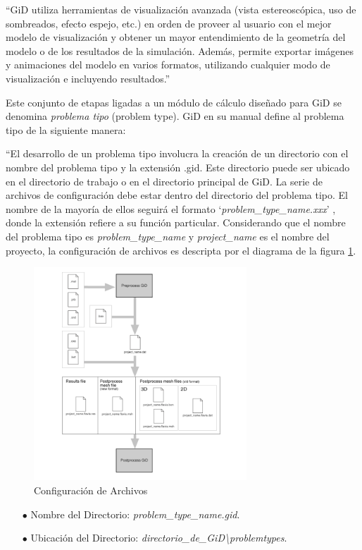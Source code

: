 \documentclass[a4paper,10pt, oneside]{book}
\begin{document}
“GiD utiliza herramientas de visualización avanzada (vista estereoscópica, uso de sombreados, efecto espejo, etc.) en orden de proveer al usuario con el mejor modelo de visualización y obtener un mayor entendimiento de la geometría del modelo o de los resultados de la simulación. Además, permite exportar imágenes y animaciones del modelo en varios formatos, utilizando cualquier modo de visualización e incluyendo resultados.” \cite{GiD}

Este conjunto de etapas ligadas a un módulo de cálculo diseñado para GiD se denomina \textit{problema tipo} (problem type). GiD en su manual define al problema tipo de la siguiente manera:

``El desarrollo de un problema tipo involucra la creación de un directorio con el nombre del problema tipo y la extensión .gid. Este directorio puede ser ubicado en el directorio de trabajo o en el directorio principal de GiD. La serie de archivos de configuración debe estar dentro del directorio del problema tipo. El nombre de la mayoría de ellos seguirá el formato `\textit{problem\_{type}\_{name.xxx}}' , donde la extensión refiere a su función particular. Considerando que el nombre del problema tipo es \textit{problem\_{type}\_{name}} y \textit{project\_{name}} es el nombre del proyecto, la configuración de archivos es descripta por el diagrama de la figura \ref{fig:problematipoGiD}. 
\begin{figure}[h!]
  \centering
  \includegraphics[width=8cm]{Img/8-2}
  \caption{Configuración de Archivos}
  \label{fig:problematipoGiD}
\end{figure}
\begin{itemize}
  \item[$\bullet$] Nombre del Directorio: \textit{problem\_{type}\_{name.gid}}.
  \item[$\bullet$] Ubicación del Directorio: \textit{directorio\_{de}\_{GiD}\textbackslash problemtypes}.
\end{itemize}
\end{document}
